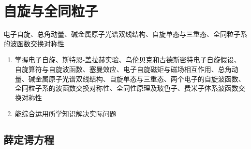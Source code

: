 \documentclass[12pt, a4paper, oneside, UTF8]{ctexbook}
\begin{document}
% 
\else
\fi

\chapter{自旋与全同粒子}
\begin{examct}{}{}
    电子自旋、总角动量、碱金属原子光谱双线结构、自旋单态与三重态、全同粒子系的波函数交换对称性
\end{examct}
\begin{examrqm}{}{}
    \begin{enumerate}
        \item 掌握电子自旋、斯特恩-盖拉赫实验、乌伦贝克和古德斯密特电子自旋假设、自旋算符与自旋波函数、塞曼效应、电子自旋磁矩与磁场相互作用、总角动量、碱金属原子光谱双线结构、自旋单态与三重态、两个电子的自旋波函数、全同粒子系的波函数交换对称性、全同性原理及玻色子、费米子体系波函数交换对称性
        \item 能综合运用所学知识解决实际问题
    \end{enumerate}
\end{examrqm}

\section{薛定谔方程}

\ifx\allfiles\undefined
\end{document}
